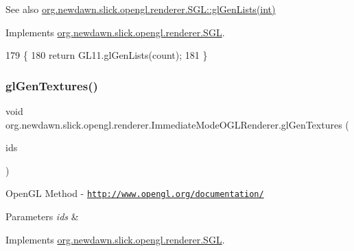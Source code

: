 \begin{DoxySeeAlso}{See also}
\mbox{\hyperlink{interfaceorg_1_1newdawn_1_1slick_1_1opengl_1_1renderer_1_1_s_g_l_a2c623d00bb2450569a6c86a71024b83d}{org.\+newdawn.\+slick.\+opengl.\+renderer.\+S\+G\+L\+::gl\+Gen\+Lists(int)}} 
\end{DoxySeeAlso}


Implements \mbox{\hyperlink{interfaceorg_1_1newdawn_1_1slick_1_1opengl_1_1renderer_1_1_s_g_l_a2c623d00bb2450569a6c86a71024b83d}{org.\+newdawn.\+slick.\+opengl.\+renderer.\+S\+GL}}.


\begin{DoxyCode}
179                                      \{
180         \textcolor{keywordflow}{return} GL11.glGenLists(count);
181     \}
\end{DoxyCode}
\mbox{\label{classorg_1_1newdawn_1_1slick_1_1opengl_1_1renderer_1_1_immediate_mode_o_g_l_renderer_a15e8cc47f15d46863da6e839bcffd6f4}} 
\subsubsection{\texorpdfstring{gl\+Gen\+Textures()}{glGenTextures()}}
{\footnotesize\ttfamily void org.\+newdawn.\+slick.\+opengl.\+renderer.\+Immediate\+Mode\+O\+G\+L\+Renderer.\+gl\+Gen\+Textures (\begin{DoxyParamCaption}\item[{Int\+Buffer}]{ids }\end{DoxyParamCaption})\hspace{0.3cm}{\ttfamily [inline]}}

Open\+GL Method -\/  \href{http://www.opengl.org/documentation/}{\tt http\+://www.\+opengl.\+org/documentation/}


\begin{DoxyParams}{Parameters}
{\em ids} & \\
\hline
\end{DoxyParams}


Implements \mbox{\hyperlink{interfaceorg_1_1newdawn_1_1slick_1_1opengl_1_1renderer_1_1_s_g_l_ab3f3f950cf59599784f17a0d19667829}{org.\+newdawn.\+slick.\+opengl.\+renderer.\+S\+GL}}.


